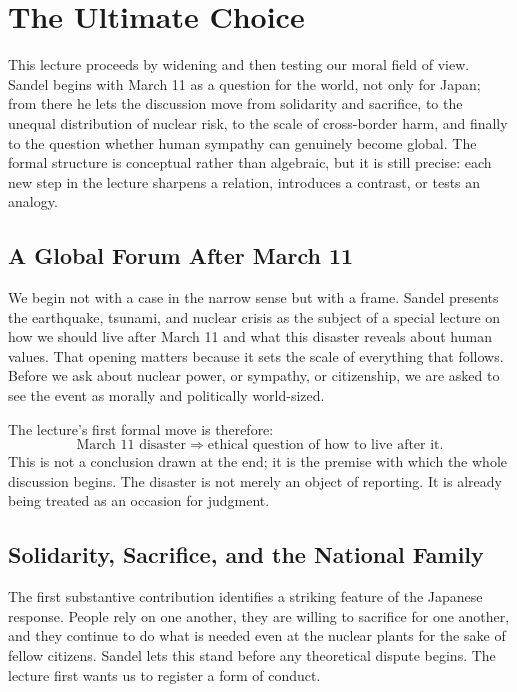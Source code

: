 \chapter{The Ultimate Choice}

This lecture proceeds by widening and then testing our moral field of view. Sandel begins with March 11 as a question for the world, not only for Japan; from there he lets the discussion move from solidarity and sacrifice, to the unequal distribution of nuclear risk, to the scale of cross-border harm, and finally to the question whether human sympathy can genuinely become global. The formal structure is conceptual rather than algebraic, but it is still precise: each new step in the lecture sharpens a relation, introduces a contrast, or tests an analogy.

\section{A Global Forum After March 11}

We begin not with a case in the narrow sense but with a frame. Sandel presents the earthquake, tsunami, and nuclear crisis as the subject of a special lecture on how we should live after March 11 and what this disaster reveals about human values. That opening matters because it sets the scale of everything that follows. Before we ask about nuclear power, or sympathy, or citizenship, we are asked to see the event as morally and politically world-sized.

The lecture's first formal move is therefore:
\begin{equation}
\text{March 11 disaster}
\Longrightarrow
\text{ethical question of how to live after it}.
\end{equation}
This is not a conclusion drawn at the end; it is the premise with which the whole discussion begins. The disaster is not merely an object of reporting. It is already being treated as an occasion for judgment.

\section{Solidarity, Sacrifice, and the National Family}

The first substantive contribution identifies a striking feature of the Japanese response. People rely on one another, they are willing to sacrifice for one another, and they continue to do what is needed even at the nuclear plants for the sake of fellow citizens. Sandel lets this stand before any theoretical dispute begins. The lecture first wants us to register a form of conduct.

